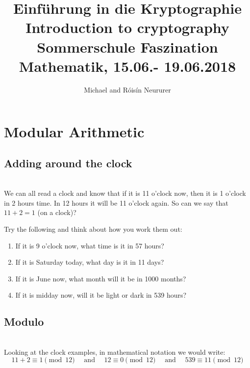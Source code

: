 \documentclass[12pt]{amsart}
\title{\myfont Einf\"uhrung in die Kryptographie \vspace{\baselineskip} \\ Introduction to cryptography
  \\ \vspace{\baselineskip} \normalfont Sommerschule Faszination Mathematik, 15.06.- 19.06.2018}
\author{Michael and R\'ois\'in Neururer}
\theoremstyle{definition}
\theoremstyle{definition}
\theoremstyle{remark}
\begin{document}
\maketitle
\newpage
\section{Modular Arithmetic}

\subsection*{Adding around the clock}
\hfill\\
We can all read a clock and know that if it is 11 o'clock now, then it is 1 o'clock in 2 hours time. In 12 hours it will be 11 o'clock again. So can we say that $11+2=1$ (on a clock)?

\vspace{10pt}

Try the following and think about how you work them out:\\

\begin{enumerate}
\item If it is 9 o'clock now, what time is it in 57 hours?\\
\item If it is Saturday today, what day is it in 11 days?\\
\item If it is June now, what month will it be in 1000 months?\\
\item If it is midday now, will it be light or dark in 539 hours?\\
\end{enumerate}




\subsection*{Modulo}
\hfill\\
Looking at the clock examples, in mathematical notation we would write:
\[
11+2 \equiv 1 \pmod {12}\quad 
\text{ and }\quad
12 \equiv 0 \pmod{12}\quad
\text{ and }\quad
539 \equiv 11 \pmod{12}
\]
\end{document}
